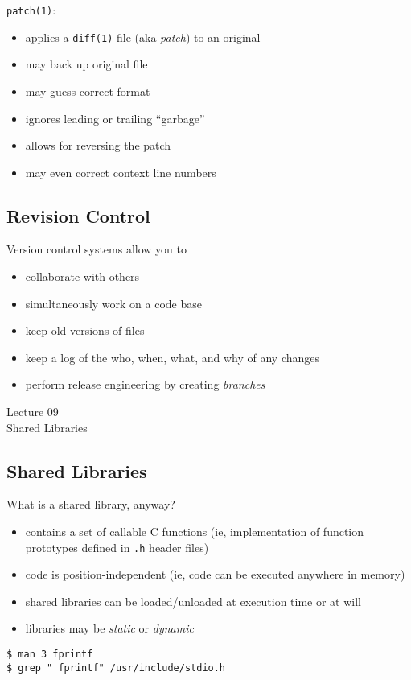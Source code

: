 \documentclass[xga]{xdvislides}
\begin{document}
{\tt patch(1)}:
\begin{itemize}
	\item applies a {\tt diff(1)} file (aka {\em patch}) to an original
	\item may back up original file
	\item may guess correct format
	\item ignores leading or trailing ``garbage''
	\item allows for reversing the patch
	\item may even correct context line numbers
\end{itemize}

\subsection{Revision Control}
Version control systems allow you to

\begin{itemize}
	\item collaborate with others
	\item simultaneously work on a code base
	\item keep old versions of files
	\item keep a log of the who, when, what, and why of any changes
	\item perform release engineering by creating {\em branches}
\end{itemize}

\newpage
\vspace*{\fill}
\begin{center}
  \Hugesize
	Lecture 09
	\hspace*{5mm}\blueline\\ [1em]
	Shared Libraries
  \Normalsize
\end{center}
\vspace*{\fill}

\subsection{Shared Libraries}
What is a shared library, anyway?
\begin{itemize}
	\item contains a set of callable C functions (ie, implementation
		of function prototypes defined in {\tt .h} header files)
	\item code is position-independent (ie, code can be executed anywhere
		in memory)
	\item shared libraries can be loaded/unloaded at execution time or at will
	\item libraries may be {\em static} or {\em dynamic}
\end{itemize}
\begin{verbatim}
$ man 3 fprintf
$ grep " fprintf" /usr/include/stdio.h
\end{verbatim}
\end{document}
